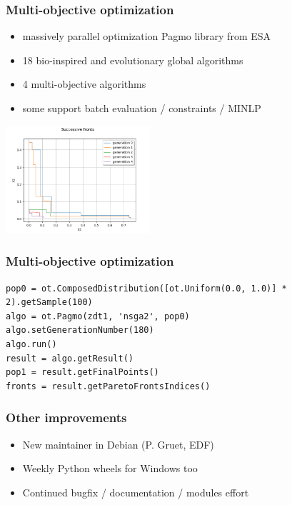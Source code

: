 \documentclass{beamer}
\begin{document}
\begin{frame}[containsverbatim]
\frametitle{Multi-objective optimization}

% 

\begin{itemize}
\item massively parallel optimization Pagmo library from ESA
\item 18 bio-inspired and evolutionary global algorithms
\item 4 multi-objective algorithms
\item some support batch evaluation / constraints / MINLP
\end{itemize}

\begin{center}
\includegraphics[width=0.4\textwidth]{figures/sphx_glr_plot_optimization_pagmo_002.png}
\end{center}
\end{frame}


\begin{frame}[containsverbatim]
\frametitle{Multi-objective optimization}

\lstset{language=python}
\begin{lstlisting}
pop0 = ot.ComposedDistribution([ot.Uniform(0.0, 1.0)] * 2).getSample(100)
algo = ot.Pagmo(zdt1, 'nsga2', pop0)
algo.setGenerationNumber(180)
algo.run()
result = algo.getResult()
pop1 = result.getFinalPoints()
fronts = result.getParetoFrontsIndices()
\end{lstlisting}


\end{frame}


\begin{frame}
\frametitle{Other improvements}

\begin{itemize}
\item New maintainer in Debian (P. Gruet, EDF)
\item Weekly Python wheels for Windows too
\item Continued bugfix / documentation / modules effort
\end{itemize}

\end{frame}
\end{document}
